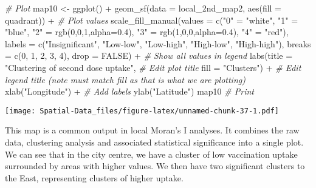 \documentclass[
]{book}
\newenvironment{Shaded}{\begin{snugshade}}{\end{snugshade}}
\newcommand{\AttributeTok}[1]{\textcolor[rgb]{0.77,0.63,0.00}{#1}}
\newcommand{\CommentTok}[1]{\textcolor[rgb]{0.56,0.35,0.01}{\textit{#1}}}
\newcommand{\ConstantTok}[1]{\textcolor[rgb]{0.00,0.00,0.00}{#1}}
\newcommand{\DecValTok}[1]{\textcolor[rgb]{0.00,0.00,0.81}{#1}}
\newcommand{\FloatTok}[1]{\textcolor[rgb]{0.00,0.00,0.81}{#1}}
\newcommand{\FunctionTok}[1]{\textcolor[rgb]{0.00,0.00,0.00}{#1}}
\newcommand{\NormalTok}[1]{#1}
\newcommand{\OtherTok}[1]{\textcolor[rgb]{0.56,0.35,0.01}{#1}}
\newcommand{\SpecialCharTok}[1]{\textcolor[rgb]{0.00,0.00,0.00}{#1}}
\newcommand{\StringTok}[1]{\textcolor[rgb]{0.31,0.60,0.02}{#1}}
\begin{document}
\begin{Shaded}
\begin{Highlighting}[]
\CommentTok{\# Plot}
\NormalTok{map10 }\OtherTok{\textless{}{-}} \FunctionTok{ggplot}\NormalTok{() }\SpecialCharTok{+}
  \FunctionTok{geom\_sf}\NormalTok{(}\AttributeTok{data =}\NormalTok{ local\_2nd\_map2, }\FunctionTok{aes}\NormalTok{(}\AttributeTok{fill =}\NormalTok{ quadrant)) }\SpecialCharTok{+} \CommentTok{\# Plot values}
  \FunctionTok{scale\_fill\_manual}\NormalTok{(}\AttributeTok{values =} \FunctionTok{c}\NormalTok{(}\StringTok{"0"} \OtherTok{=} \StringTok{"white"}\NormalTok{, }\StringTok{"1"} \OtherTok{=} \StringTok{"blue"}\NormalTok{, }\StringTok{"2"} \OtherTok{=} \FunctionTok{rgb}\NormalTok{(}\DecValTok{0}\NormalTok{,}\DecValTok{0}\NormalTok{,}\DecValTok{1}\NormalTok{,}\AttributeTok{alpha=}\FloatTok{0.4}\NormalTok{), }\StringTok{"3"} \OtherTok{=} \FunctionTok{rgb}\NormalTok{(}\DecValTok{1}\NormalTok{,}\DecValTok{0}\NormalTok{,}\DecValTok{0}\NormalTok{,}\AttributeTok{alpha=}\FloatTok{0.4}\NormalTok{), }\StringTok{"4"} \OtherTok{=} \StringTok{"red"}\NormalTok{),}
                    \AttributeTok{labels =} \FunctionTok{c}\NormalTok{(}\StringTok{"Insignificant"}\NormalTok{, }\StringTok{"Low{-}low"}\NormalTok{, }\StringTok{"Low{-}high"}\NormalTok{, }\StringTok{"High{-}low"}\NormalTok{, }\StringTok{"High{-}high"}\NormalTok{),}
                    \AttributeTok{breaks =} \FunctionTok{c}\NormalTok{(}\DecValTok{0}\NormalTok{, }\DecValTok{1}\NormalTok{, }\DecValTok{2}\NormalTok{, }\DecValTok{3}\NormalTok{, }\DecValTok{4}\NormalTok{), }
                    \AttributeTok{drop =} \ConstantTok{FALSE}\NormalTok{) }\SpecialCharTok{+} \CommentTok{\# Show all values in legend}
  \FunctionTok{labs}\NormalTok{(}\AttributeTok{title =} \StringTok{"Clustering of second dose uptake"}\NormalTok{, }\CommentTok{\# Edit plot title }
    \AttributeTok{fill =} \StringTok{"Clusters"}\NormalTok{) }\SpecialCharTok{+} \CommentTok{\# Edit legend title (note must match fill as that is what we are plotting)}
  \FunctionTok{xlab}\NormalTok{(}\StringTok{"Longitude"}\NormalTok{) }\SpecialCharTok{+} \CommentTok{\# Add labels}
  \FunctionTok{ylab}\NormalTok{(}\StringTok{"Latitude"}\NormalTok{)}
\NormalTok{map10 }\CommentTok{\# Print}
\end{Highlighting}
\end{Shaded}

\texttt{[image: Spatial-Data\_files/figure-latex/unnamed-chunk-37-1.pdf]}

This map is a common output in local Moran's I analyses. It combines the raw data, clustering analysis and associated statistical significance into a single plot. We can see that in the city centre, we have a cluster of low vaccination uptake surrounded by areas with higher values. We then have two significant clusters to the East, representing clusters of higher uptake.
\end{document}
